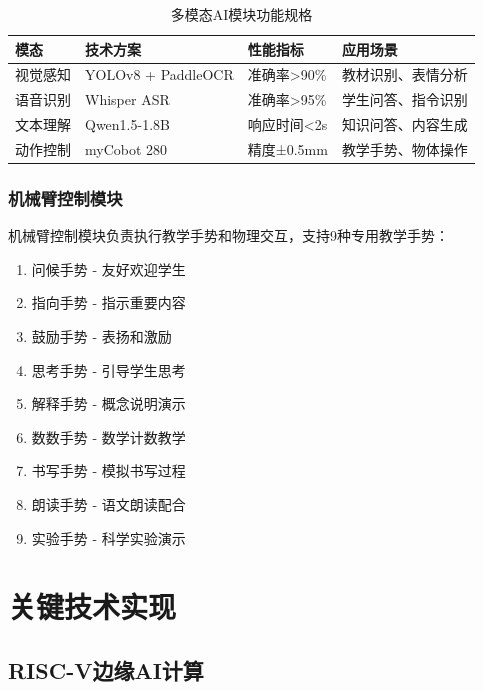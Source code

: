 \documentclass[12pt,a4paper]{article}
\begin{document}
\begin{table}[H]
    \centering
    \caption{多模态AI模块功能规格}
    \begin{tabular}{|l|l|l|l|}
        \hline
        \textbf{模态} & \textbf{技术方案} & \textbf{性能指标} & \textbf{应用场景} \\
        \hline
        视觉感知 & YOLOv8 + PaddleOCR & 准确率>90\% & 教材识别、表情分析 \\
        \hline
        语音识别 & Whisper ASR & 准确率>95\% & 学生问答、指令识别 \\
        \hline
        文本理解 & Qwen1.5-1.8B & 响应时间<2s & 知识问答、内容生成 \\
        \hline
        动作控制 & myCobot 280 & 精度±0.5mm & 教学手势、物体操作 \\
        \hline
    \end{tabular}
    \label{tab:multimodal}
\end{table}

\subsubsection{机械臂控制模块}

机械臂控制模块负责执行教学手势和物理交互，支持9种专用教学手势：

\begin{enumerate}[leftmargin=2em]
    \item 问候手势 - 友好欢迎学生
    \item 指向手势 - 指示重要内容
    \item 鼓励手势 - 表扬和激励
    \item 思考手势 - 引导学生思考
    \item 解释手势 - 概念说明演示
    \item 数数手势 - 数学计数教学
    \item 书写手势 - 模拟书写过程
    \item 朗读手势 - 语文朗读配合
    \item 实验手势 - 科学实验演示
\end{enumerate}

\newpage

\section{关键技术实现}

\subsection{RISC-V边缘AI计算}
\end{document}
